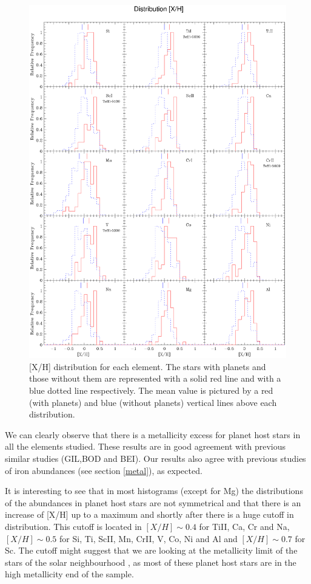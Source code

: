 \documentclass[dvips,12pt,a4paper]{report}
\begin{document}
{{\begin{figure}[h!]
\centering
\includegraphics[trim=0cm 2cm 0cm 1cm,clip,width=15 cm]{pics/parte4/histxhfinal.eps}
\caption[depois]{[X/H] distribution for each element. The stars with planets and those without them are represented with a solid red line and with a blue dotted line respectively. The mean value is pictured by a red (with planets) and blue (without planets) vertical lines above each distribution.}
\label{gfxdistro}
\end{figure}



We can clearly observe that there is a metallicity excess for planet host stars in all the elements studied. These results are in good agreement with previous similar studies (GIL,BOD and BEI). Our results also agree with previous studies of iron abundances (see section \ref{metal}), as expected.

It is interesting to see that in most histograms (except for Mg) the distributions of the abundances in planet host stars are not symmetrical and that there is an increase of [X/H] up to a maximum and shortly after there is a huge cutoff in distribution. This cutoff is located in $[X/H]\sim0.4$ for TiII, Ca, Cr and Na, $[X/H]\sim0.5$ for Si, Ti, ScII, Mn, CrII, V, Co, Ni and Al and $[X/H]\sim0.7$ for Sc. The cutoff might suggest that we are looking at the metallicity limit of the stars of the solar neighbourhood \citep[e.g.][]{Santos-2003}, as most of these planet host stars are in the high metallicity end of the sample. 

}}
\end{document}
